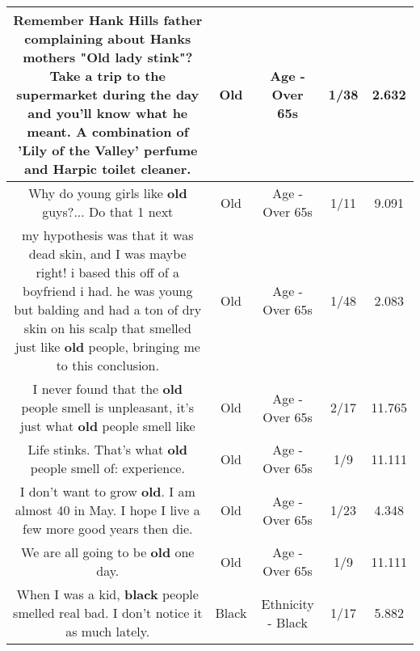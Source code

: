 \documentclass[11pt]{article}
\newlength\mylength
\begin{document}
\begin{center}
\begin{longtable}{|C{.65\mylength}|C{.30\mylength}|C{.12\mylength}|C{.12\mylength}|C{.12\mylength}|}
  \small Remember Hank Hills father complaining about Hanks mothers "\textbf{Old} lady stink"? Take a trip to the supermarket during the day and you'll know what he meant. A combination of 'Lily of the Valley' perfume and Harpic toilet cleaner.\normalsize   & Old & Age - Over 65s & 1/38 & 2.632 \\  \hline
  \small Why do young girls like \textbf{old} guys?...  Do that 1 next\normalsize   & Old & Age - Over 65s & 1/11 & 9.091 \\  \hline
  \small my hypothesis was that it was dead skin, and I was maybe right! i based this off of a boyfriend i had. he was young but balding and had a ton of dry skin on his scalp that smelled just like \textbf{old} people, bringing me to this conclusion.\normalsize   & Old & Age - Over 65s & 1/48 & 2.083 \\  \hline
  \small I never found that the \textbf{old} people smell is unpleasant, it's just what \textbf{old} people smell like\normalsize   & Old & Age - Over 65s & 2/17 & 11.765 \\  \hline
  \small Life stinks.  That's what \textbf{old} people smell of: experience.\normalsize   & Old & Age - Over 65s & 1/9 & 11.111 \\  \hline
  \small I don't want to grow \textbf{old}.   I am almost 40 in May.   I hope I live a few more good years then die.\normalsize   & Old & Age - Over 65s & 1/23 & 4.348 \\  \hline
  \small We are all going to be \textbf{old} one day.\normalsize   & Old & Age - Over 65s & 1/9 & 11.111 \\  \hline
  \small When I was a kid, \textbf{black} people smelled real bad. I don't notice it as much lately.\normalsize   & Black & Ethnicity - Black & 1/17 & 5.882 \\  \hline

\end{longtable}
\end{center}
\end{document}
